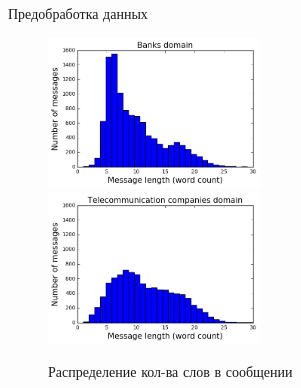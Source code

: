 \documentclass{beamer}
\begin{document}
\begin{frame}{Предобработка данных}

\begin{figure}[!h]
\caption{Распределение кол-ва слов в сообщении}
  \includegraphics[width=0.5\textwidth]{images/mess_len_bank.png}
    \includegraphics[width=0.5\textwidth]{images/mess_len_tkk2.png}
\end{figure}

\end{frame}
\end{document}
